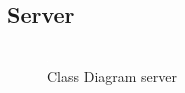         \subsection{Server}
            \begin{figure}[htbp!]
                \includegraphics[width=0.35\linewidth]{Immagini/Diagrammi/Class Diagram/ClassDiagramServer.pdf}
            \caption{Class Diagram server}
            \label{fig:Class Diagram server}
            \end{figure}

